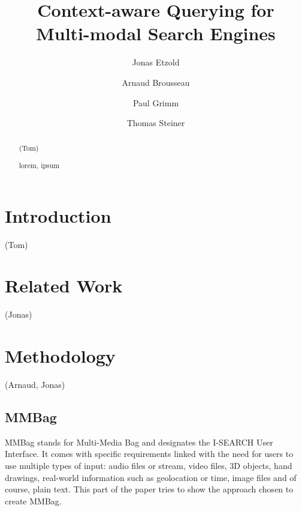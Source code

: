 \documentclass[runningheads,a4paper]{llncs}
\newcommand{\keywords}[1]{\par\addvspace\baselineskip
\noindent\keywordname\enspace\ignorespaces#1}
\begin{document}
\mainmatter  %

\title{Context-aware Querying for\\ Multi-modal Search Engines}


\author{Jonas Etzold \and Arnaud Brousseau \and Paul Grimm \and Thomas Steiner}



\maketitle

\begin{abstract}
(Tom)
\keywords{lorem, ipsum}
\end{abstract}

\section{Introduction}
(Tom) \cite{ijmis}

\section{Related Work}
(Jonas) \cite{nigay}

\section{Methodology}
(Arnaud, Jonas)

\subsection{MMBag}

MMBag stands for Multi-Media Bag and designates the I-SEARCH User Interface. It comes with specific requirements linked with the need for users to use multiple types of input: audio files or stream, video files, 3D objects, hand drawings, real-world information such as geolocation or time, image files and of course, plain text. This part of the paper tries to show the approach chosen to create MMBag.
\end{document}
